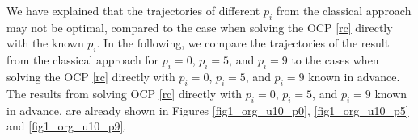 





We have explained that the trajectories of different $p_i$ from the classical approach may not be optimal, compared to the case when solving the OCP \ref{rc} directly with the known $p_i$. In the following, we compare the trajectories of the result from the classical approach for $p_i=0$, $p_i=5$, and $p_i=9$ to the cases when solving the OCP \ref{rc} directly with $p_i=0$, $p_i=5$, and $p_i=9$ known in advance. The results from solving OCP \ref{rc} directly with $p_i=0$, $p_i=5$, and $p_i=9$ known in advance, are already shown in Figures \ref{fig1_org_u10_p0},  \ref{fig1_org_u10_p5} and \ref{fig1_org_u10_p9}. 

